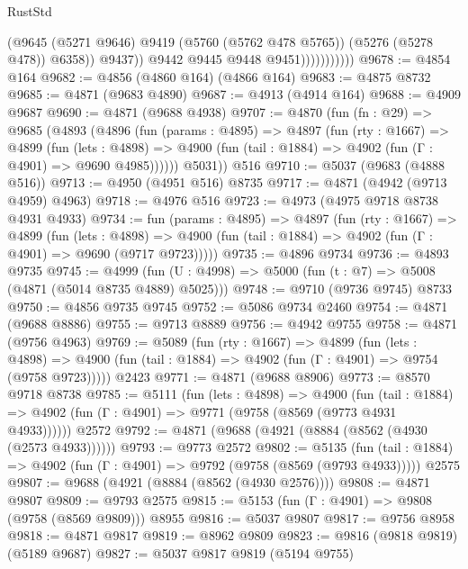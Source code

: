 \begin{lexlean}{RustStd}
\begin{coremodule}
                                (@9645
                                  (@5271 @9646)
                                  @9419
                                  (@5760 (@5762 @478 @5765))
                                  (@5276 (@5278 @478))
                                  @6358))
                              @9437))
                          @9442
                          @9445
                          @9448
                          @9451)))))))))))
@9678 := @4854 @164
@9682 := @4856 (@4860 @164) (@4866 @164)
@9683 := @4875 @8732
@9685 := @4871 (@9683 @4890)
@9687 := @4913 (@4914 @164)
@9688 := @4909 @9687
@9690 := @4871 (@9688 @4938)
@9707 := @4870
    (fun (fn : @29) =>
    @9685
      (@4893
        (@4896
          (fun (params : @4895) =>
          @4897
            (fun (rty : @1667) =>
            @4899
              (fun (lets : @4898) =>
              @4900 (fun (tail : @1884) => @4902 (fun (Γ : @4901) => @9690 @4985))))))
        @5031))
    @516
@9710 := @5037 (@9683 (@4888 @516))
@9713 := @4950 (@4951 @516) @8735
@9717 := @4871 (@4942 (@9713 @4959) @4963)
@9718 := @4976 @516
@9723 := @4973 (@4975 @9718 @8738 @4931 @4933)
@9734 := fun (params : @4895) =>
  @4897
    (fun (rty : @1667) =>
    @4899
      (fun (lets : @4898) =>
      @4900 (fun (tail : @1884) => @4902 (fun (Γ : @4901) => @9690 (@9717 @9723)))))
@9735 := @4896 @9734
@9736 := @4893 @9735
@9745 := @4999 (fun (U : @4998) => @5000 (fun (t : @7) => @5008 (@4871 (@5014 @8735 @4889) @5025)))
@9748 := @9710 (@9736 @9745) @8733
@9750 := @4856 @9735 @9745
@9752 := @5086 @9734 @2460
@9754 := @4871 (@9688 @8886)
@9755 := @9713 @8889
@9756 := @4942 @9755
@9758 := @4871 (@9756 @4963)
@9769 := @5089
    (fun (rty : @1667) =>
    @4899
      (fun (lets : @4898) =>
      @4900 (fun (tail : @1884) => @4902 (fun (Γ : @4901) => @9754 (@9758 @9723)))))
    @2423
@9771 := @4871 (@9688 @8906)
@9773 := @8570 @9718 @8738
@9785 := @5111
    (fun (lets : @4898) =>
    @4900
      (fun (tail : @1884) => @4902 (fun (Γ : @4901) => @9771 (@9758 (@8569 (@9773 @4931 @4933))))))
    @2572
@9792 := @4871 (@9688 (@4921 (@8884 (@8562 (@4930 (@2573 @4933))))))
@9793 := @9773 @2572
@9802 := @5135
    (fun (tail : @1884) => @4902 (fun (Γ : @4901) => @9792 (@9758 (@8569 (@9793 @4933)))))
    @2575
@9807 := @9688 (@4921 (@8884 (@8562 (@4930 @2576))))
@9808 := @4871 @9807
@9809 := @9793 @2575
@9815 := @5153 (fun (Γ : @4901) => @9808 (@9758 (@8569 @9809))) @8955
@9816 := @5037 @9807
@9817 := @9756 @8958
@9818 := @4871 @9817
@9819 := @8962 @9809
@9823 := @9816 (@9818 @9819) (@5189 @9687)
@9827 := @5037 @9817 @9819 (@5194 @9755)

\end{coremodule}
\end{lexlean}

